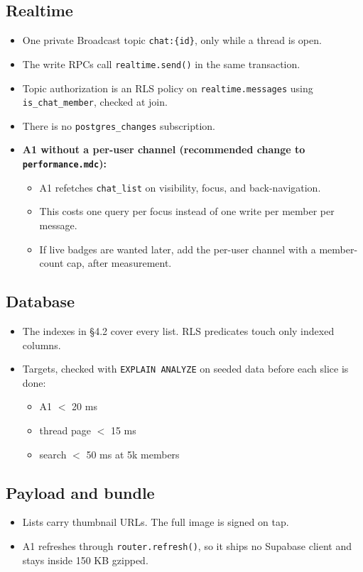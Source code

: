 \documentclass[11pt,a4paper]{article}
\newcommand{\code}[1]{\texttt{\small #1}}
\begin{document}
\subsection{Realtime}\label{sec:rt}
\begin{itemize}
  \item One private Broadcast topic \code{chat:\{id\}}, only while a thread is open.
  \item The write RPCs call \code{realtime.send()} in the same transaction.
  \item Topic authorization is an RLS policy on \code{realtime.messages} using \code{is\_chat\_member}, checked at join.
  \item There is no \code{postgres\_changes} subscription.
  \item \textbf{A1 without a per-user channel (recommended change to \code{performance.mdc}):}
        \begin{itemize}
          \item A1 refetches \code{chat\_list} on visibility, focus, and back-navigation.
          \item This costs one query per focus instead of one write per member per message.
          \item If live badges are wanted later, add the per-user channel with a member-count cap, after measurement.
        \end{itemize}
\end{itemize}

\subsection{Database}
\begin{itemize}
  \item The indexes in \S4.2 cover every list. RLS predicates touch only indexed columns.
  \item Targets, checked with \code{EXPLAIN ANALYZE} on seeded data before each slice is done:
        \begin{itemize}
          \item A1 $<$ 20 ms
          \item thread page $<$ 15 ms
          \item search $<$ 50 ms at 5k members
        \end{itemize}
\end{itemize}

\subsection{Payload and bundle}
\begin{itemize}
  \item Lists carry thumbnail URLs. The full image is signed on tap.
  \item A1 refreshes through \code{router.refresh()}, so it ships no Supabase client and stays inside 150 KB gzipped.
\end{itemize}
\end{document}
